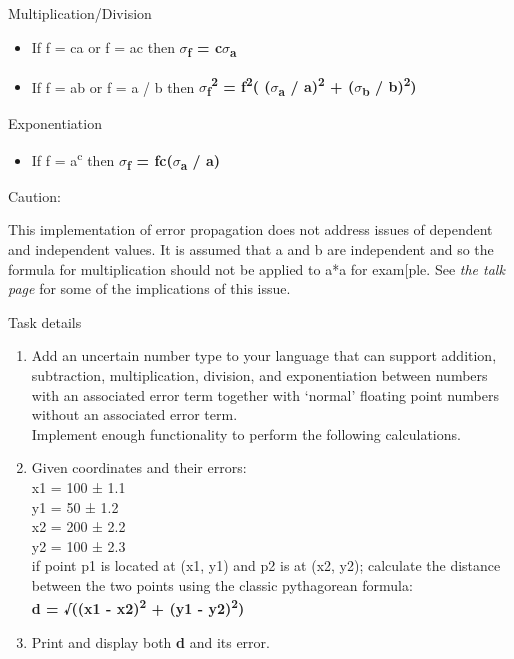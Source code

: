 Multiplication/Division

\begin{itemize}
\item
  If f = ca or f = ac then \textbf{$\sigma$\textsubscript{f} =
  \textbar{}c$\sigma$\textsubscript{a}\textbar{}}
\item
  If f = ab or f = a / b then
  \textbf{$\sigma$\textsubscript{f}\textsuperscript{2} = f\textsuperscript{2}(
  ($\sigma$\textsubscript{a} / a)\textsuperscript{2} + ($\sigma$\textsubscript{b} /
  b)\textsuperscript{2})}
\end{itemize}

Exponentiation

\begin{itemize}
\item
  If f = a\textsuperscript{c} then \textbf{$\sigma$\textsubscript{f} =
  \textbar{}fc($\sigma$\textsubscript{a} / a)\textbar{}}
\end{itemize}

Caution:

This implementation of error propagation does not address issues of
dependent and independent values. It is assumed that a and b are
independent and so the formula for multiplication should not be applied
to a*a for exam{[}ple. See
\emph{the talk page} for some of
the implications of this issue.

\pagebreak{}

\begin{description}
\item[Task details]
\end{description}

\begin{enumerate}
\item
  Add an uncertain number type to your language that can support
  addition, subtraction, multiplication, division, and exponentiation
  between numbers with an associated error term together with `normal'
  floating point numbers without an associated error term. \\Implement
  enough functionality to perform the following calculations.
\item
  Given coordinates and their errors:\\x1 = 100 ± 1.1\\y1 = 50 ± 1.2\\x2
  = 200 ± 2.2\\y2 = 100 ± 2.3\\ if point p1 is located at (x1, y1) and
  p2 is at (x2, y2); calculate the distance between the two points using
  the classic pythagorean formula:\\ \textbf{d = √((x1 -
  x2)\textsuperscript{2} + (y1 - y2)\textsuperscript{2})}
\item
  Print and display both \textbf{d} and its error.
\end{enumerate}

